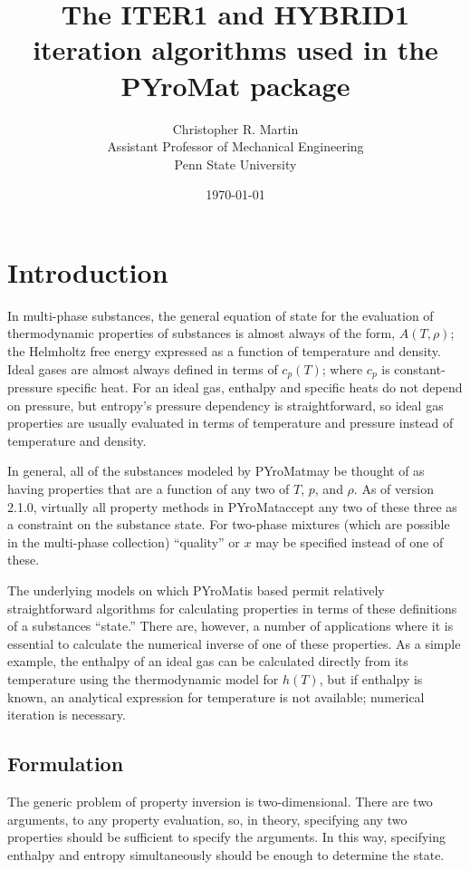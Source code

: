 \documentclass{article}
\title{The ITER1 and HYBRID1 iteration algorithms used in the PYroMat package}
\author{Christopher R. Martin\\Assistant Professor of Mechanical Engineering\\Penn State University}
\date{\today}
\def\pm{PYroMat}
\begin{document}
\maketitle

\section{Introduction}

In multi-phase substances, the general equation of state for the evaluation of thermodynamic properties of substances is almost always of the form, $A(T,\rho)$; the Helmholtz free energy expressed as a function of temperature and density.  Ideal gases are almost always defined in terms of $c_p(T)$; where $c_p$ is constant-pressure specific heat.  For an ideal gas, enthalpy and specific heats do not depend on pressure, but entropy's pressure dependency is straightforward, so ideal gas properties are usually evaluated in terms of temperature and pressure instead of temperature and density.

In general, all of the substances modeled by \pm may be thought of as having properties that are a function of any two of $T$, $p$, and $\rho$.  As of version 2.1.0, virtually all property methods in \pm accept any two of these three as a constraint on the substance state.  For two-phase mixtures (which are possible in the multi-phase collection) ``quality'' or $x$ may be specified instead of one of these.

The underlying models on which \pm is based permit relatively straightforward algorithms for calculating properties in terms of these definitions of a substances ``state.''  There are, however, a number of applications where it is essential to calculate the numerical inverse of one of these properties.  As a simple example, the enthalpy of an ideal gas can be calculated directly from its temperature using the thermodynamic model for $h(T)$, but if enthalpy is known, an analytical expression for temperature is not available; numerical iteration is necessary.

\subsection{Formulation}

The generic problem of property inversion is two-dimensional.  There are two arguments, to any property evaluation, so, in theory, specifying any two properties should be sufficient to specify the arguments.  In this way, specifying enthalpy and entropy simultaneously should be enough to determine the state.  
\end{document}
